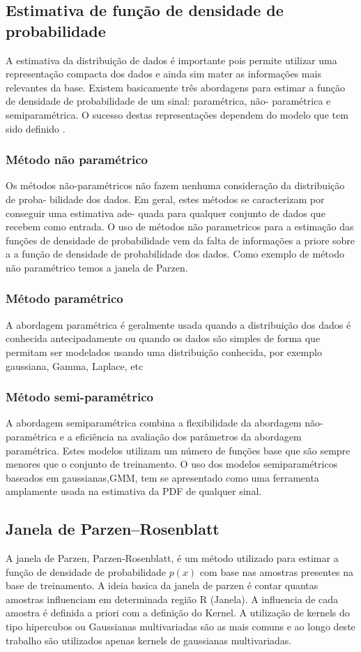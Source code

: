 \documentclass[ 
	article,			%
	11pt,				%
	oneside,			%
	a4paper,			%
	english,			%
	brazil,				%
	]{abntex2}
\begin{document}
\subsection{Estimativa de função de densidade de probabilidade}
A estimativa da distribuição de dados é importante pois permite utilizar uma
representação compacta dos dados e ainda sim mater as informações mais
relevantes da base. Existem basicamente três abordagens para estimar a função de
densidade de probabilidade de um sinal: paramétrica, não- paramétrica e
semiparamétrica. O sucesso destas representações dependem do modelo que tem sido
definido \cite{Duda}.

\subsubsection{Método não paramétrico}
Os métodos não-paramétricos não fazem nenhuma consideração da distribuição de
proba- bilidade dos dados. Em geral, estes métodos se caracterizam por conseguir
uma estimativa ade- quada para qualquer conjunto de dados que recebem como
entrada. O uso de métodos não parametricos para a estimação das funções de
densidade de probabilidade vem da falta de informações a priore sobre a a função
de densidade de probabilidade dos dados. Como exemplo de método não paramétrico
temos a janela de Parzen.




\subsubsection{Método paramétrico}
A abordagem paramétrica é geralmente usada quando a distribuição dos dados é
conhecida antecipadamente ou quando os dados são simples de forma que permitam
ser modelados usando uma distribuição conhecida, por exemplo gaussiana, Gamma,
Laplace, etc

\subsubsection{Método semi-paramétrico}
A abordagem semiparamétrica  combina a flexibilidade da abordagem
não-paramétrica e a eficiência na avaliação dos parâmetros da abordagem
paramétrica. Estes modelos utilizam um número de funções base que são sempre
menores que o conjunto de treinamento. O uso dos modelos semiparamétricos
baseados em gaussianas,GMM, tem se apresentado como uma ferramenta amplamente
usada na estimativa da PDF de qualquer sinal.

\subsection{Janela de Parzen–Rosenblatt }
A janela de Parzen, Parzen-Rosenblatt, é um método utilizado para estimar a
função de densidade de probabilidade $p(x)$ com base nas amostras presentes na
base de treinamento. A ideia basica da janela de parzen é contar quantas
amostras influenciam em determinada região R (Janela). A influencia de cada
amostra é definida a priori com a definição do Kernel. A utilização de kernels
do tipo hipercubos ou Gaussianas multivariadas são as mais comuns e ao longo
deste trabalho são utilizados apenas kernels de gaussianas multivariadas.
\end{document}

